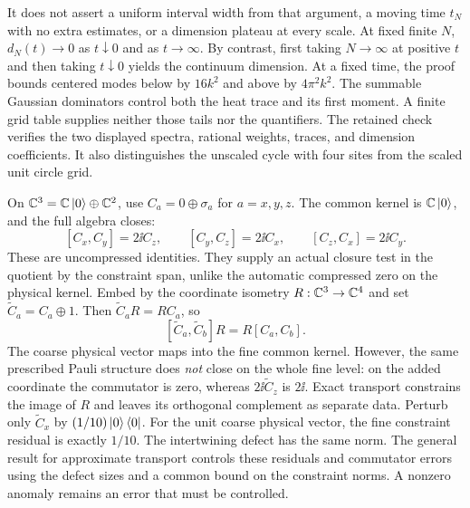It does not assert a uniform interval width from that argument, a moving time $t_N$ with no extra estimates, or a dimension plateau at every scale. At fixed finite $N$, $d_N(t)\to0$ as $t\downarrow0$ and as $t\to\infty$. By contrast, first taking $N\to\infty$ at positive $t$ and then taking $t\downarrow0$ yields the continuum dimension.
At a fixed time, the proof bounds centered modes below by $16k^2$ and above by $4\pi^2k^2$. The summable Gaussian dominators control both the heat trace and its first moment. A finite grid table supplies neither those tails nor the quantifiers. The retained check verifies the two displayed spectra, rational weights, traces, and dimension coefficients. It also distinguishes the unscaled cycle with four sites from the scaled unit circle grid.

On $\CC^3=\CC\ket0\oplus\CC^2$, use $C_a=0\oplus\sigma_a$ for $a=x,y,z$. The common kernel is $\CC\ket0$, and the full algebra closes:
\[
[C_x,C_y]=2\ii C_z,\qquad[C_y,C_z]=2\ii C_x,\qquad[C_z,C_x]=2\ii C_y.
\]
These are uncompressed identities. They supply an actual closure test in the quotient by the constraint span, unlike the automatic compressed zero on the physical kernel.
Embed by the coordinate isometry $R:\CC^3\to\CC^4$ and set $\widetilde C_a=C_a\oplus1$. Then $\widetilde C_aR=RC_a$, so
\[
[\widetilde C_a,\widetilde C_b]R=R[C_a,C_b].
\]
The coarse physical vector maps into the fine common kernel. However, the same prescribed Pauli structure does \emph{not} close on the whole fine level: on the added coordinate the commutator is zero, whereas $2\ii\widetilde C_z$ is $2\ii$. Exact transport constrains the image of $R$ and leaves its orthogonal complement as separate data.
Perturb only $\widetilde C_x$ by $(1/10)\left|0\right\rangle\left\langle0\right|$. For the unit coarse physical vector, the fine constraint residual is exactly $1/10$. The intertwining defect has the same norm. The general result for approximate transport controls these residuals and commutator errors using the defect sizes and a common bound on the constraint norms. A nonzero anomaly remains an error that must be controlled.

